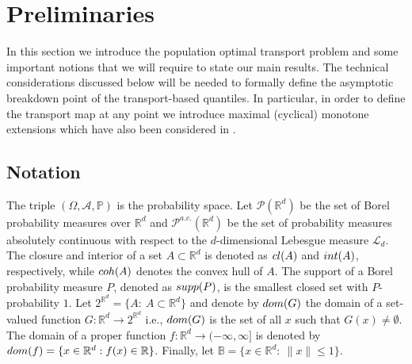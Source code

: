 \documentclass[11pt]{article}
\newcommand{\R}{\mathbb{R}}
\theoremstyle{plain}
\theoremstyle{definition}
\begin{document}
 

\section{Preliminaries}\label{Sect:Defintions}
In this section we introduce the population optimal transport problem and some important notions that we will require to state our main results. { The technical considerations discussed below  will be needed to formally define the asymptotic breakdown point of the transport-based quantiles. In particular, in order to define the transport map at any point we introduce maximal {  (cyclical)} monotone extensions which have also been considered in \cite{HallinDelBarrioCuestaAlbertosMatran.21, delBarriodoGonzalezSanzHallin.24, segers2022graphicaluniformconsistencyestimated,gonzálezsanz.2025.nonparametricvectorquantileautoregression}.}


\subsection{Notation}
The triple $(\Omega, \mathcal{A},\mathbb{P})  $ is the probability space. 
Let $\mathcal{P}(\R^d)$ be the set of Borel probability  measures over $\R^d$ and 
$ \mathcal{P}^{a.c.}(\R^d)$ 
be the set of probability measures absolutely continuous  with respect to  the $d$-dimensional Lebesgue measure $\mathcal{L}_d$. The  closure and interior of a set $A\subset \R^d$ is denoted as ${\rm cl}(A)$ and ${\rm int}(A)$, respectively, while ${\rm coh}(A)$ denotes the convex hull of $A$.  The support of a Borel probability measure $P$, denoted as ${\rm supp}(P)$,  is the smallest closed set  with ${P}$-probability $1$.  Let $2^{\R^d}=\{A: \ A\subset \R^d\}$  and  denote by ${\rm dom}(G)$ the domain of a set-valued function $G:\mathbb{R}^d\to 2^{\mathbb{R}^d}$ i.e., ${\rm dom}(G)$ is the set of all $x$ such that $G(x)\neq \emptyset$.  {The domain of a proper function $f:\R^d\to (-\infty, \infty]$ is denoted by ${\rm dom}(f)=\{x\in \R^d: f(x)\in \R\}$.} Finally,  let  $\mathbb{B}=\{x\in\mathbb{R}^d: ~\|x\|\leq 1\}$.
%
\end{document}
